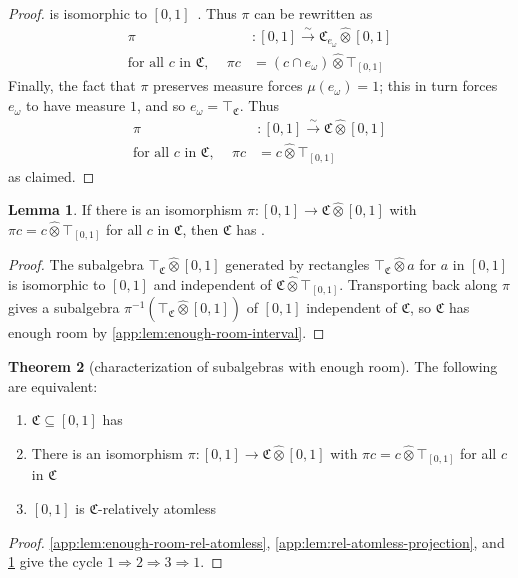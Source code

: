 \documentclass[
  sigconf,
  screen, ]{acmart}
\theoremstyle{definition}
\newtheorem{theorem}{Theorem}[section]
\newtheorem{lemma}[theorem]{Lemma}
\newcommand\frakC{\mathfrak C}
\newcommand\fremlinf[3]{\cite[\href{https://www1.essex.ac.uk/maths/people/fremlin/chap#2.pdf\#page=#3}{#1}]{fremlin2000measure}}
\newcommand\lmafp{\mathbin{\hat\otimes}}
\begin{document}
\begin{proof}
  is isomorphic to $[0,1]$~\fremlinf{254K}{25}{53}.
  Thus $\pi$ can be rewritten as
   \begin{align*}
      \pi &: [0,1] \xrightarrow{\sim} \frakC_{e_\omega}\lmafp [0,1] \\
      \text{for all $c$ in $\frakC$, }\quad\pi c &= (c\cap e_\omega)\lmafp \top_{[0,1]}
   \end{align*}
  Finally, the fact that $\pi$ preserves measure forces $\mu(e_\omega) = 1$;
  this in turn forces $e_\omega$ to have measure $1$, and so $e_\omega = \top_\frakC$.
  Thus
   \begin{align*}
      \pi &: [0,1] \xrightarrow{\sim} \frakC\lmafp [0,1]\\
      \text{for all $c$ in $\frakC$, }\quad\pi c &= c\lmafp \top_{[0,1]}
   \end{align*}
  as claimed.
\end{proof}

\begin{lemma} \label{app:lem:projection-enough-room}
  If there is an isomorphism $\pi : [0,1]\to \frakC\lmafp[0,1]$
  with $\pi c = c\lmafp \top_{[0,1]}$
  for all $c$ in $\frakC$,
  then 
  $\frakC$ has .
\end{lemma}
\begin{proof}
  The subalgebra $\top_\frakC\lmafp[0,1]$ generated by
  rectangles $\top_\frakC\lmafp a$ for $a$ in $[0,1]$
  is isomorphic to $[0,1]$ and independent
  of $\frakC\lmafp\top_{[0,1]}$.
  Transporting back along $\pi$
  gives a subalgebra $\pi^{-1}(\top_\frakC\lmafp[0,1])$
  of $[0,1]$ independent of $\frakC$,
  so $\frakC$ has enough room by \cref{app:lem:enough-room-interval}.
\end{proof}

\begin{theorem}[characterization of subalgebras with enough room] \label{app:thm:enough-room-char}
  The following are equivalent:
  \begin{enumerate}
    \item $\frakC\subseteq [0,1]$ has 
    \item 
      There is an isomorphism $\pi : [0,1]\to \frakC\lmafp[0,1]$
      with $\pi c = c\lmafp \top_{[0,1]}$
      for all $c$ in $\frakC$
    \item $[0,1]$ is $\frakC$-relatively atomless
  \end{enumerate}
\end{theorem}
\begin{proof}
  \cref{app:lem:enough-room-rel-atomless},
  \cref{app:lem:rel-atomless-projection},
  and \cref{app:lem:projection-enough-room}
  give the cycle
  $1\Rightarrow2\Rightarrow3\Rightarrow 1$.
\end{proof}
\end{document}
